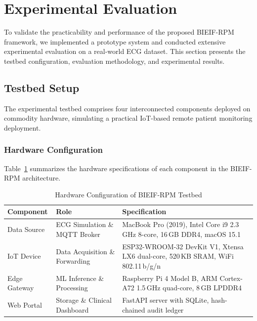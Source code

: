 
\section{Experimental Evaluation}
\label{sec:experiments}

To validate the practicability and performance of the proposed BIEIF-RPM framework, we implemented a prototype system and conducted extensive experimental evaluation on a real-world ECG dataset. This section presents the testbed configuration, evaluation methodology, and experimental results.

\subsection{Testbed Setup}
\label{subsec:testbed}

The experimental testbed comprises four interconnected components deployed on commodity hardware, simulating a practical IoT-based remote patient monitoring deployment.

\subsubsection{Hardware Configuration}

Table~\ref{tab:hardware} summarizes the hardware specifications of each component in the BIEIF-RPM architecture.

\begin{table}[htbp]
\centering
\caption{Hardware Configuration of BIEIF-RPM Testbed}
\label{tab:hardware}
\begin{tabular}{@{}p{2cm}p{2.5cm}p{3.2cm}@{}}
\toprule
\textbf{Component} & \textbf{Role} & \textbf{Specification} \\
\midrule
Data Source & ECG Simulation \& MQTT Broker & MacBook Pro (2019), Intel Core i9 2.3\,GHz 8-core, 16\,GB DDR4, macOS 15.1 \\
\addlinespace
IoT Device & Data Acquisition \& Forwarding & ESP32-WROOM-32 DevKit V1, Xtensa LX6 dual-core, 520\,KB SRAM, WiFi 802.11\,b/g/n \\
\addlinespace
Edge Gateway & ML Inference \& Processing & Raspberry Pi 4 Model B, ARM Cortex-A72 1.5\,GHz quad-core, 8\,GB LPDDR4 \\
\addlinespace
Web Portal & Storage \& Clinical Dashboard & FastAPI server with SQLite, hash-chained audit ledger \\
\bottomrule
\end{tabular}
\end{table}

